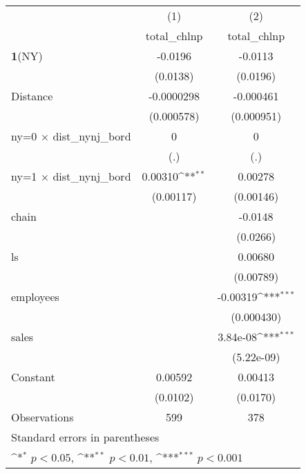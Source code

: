{
\def\sym#1{\ifmmode^{#1}\else\(^{#1}\)\fi}
\begin{tabular}{l*{2}{c}}
\hline\hline
                    &\multicolumn{1}{c}{(1)}&\multicolumn{1}{c}{(2)}\\
                    &\multicolumn{1}{c}{total\_chlnp}&\multicolumn{1}{c}{total\_chlnp}\\
\hline
\textbf{1}(NY)      &     -0.0196         &     -0.0113         \\
                    &    (0.0138)         &    (0.0196)         \\
[1em]
Distance            &  -0.0000298         &   -0.000461         \\
                    &  (0.000578)         &  (0.000951)         \\
[1em]
ny=0 $\times$ dist\_nynj\_bord&           0         &           0         \\
                    &         (.)         &         (.)         \\
[1em]
ny=1 $\times$ dist\_nynj\_bord&     0.00310\sym{**} &     0.00278         \\
                    &   (0.00117)         &   (0.00146)         \\
[1em]
chain               &                     &     -0.0148         \\
                    &                     &    (0.0266)         \\
[1em]
ls                  &                     &     0.00680         \\
                    &                     &   (0.00789)         \\
[1em]
employees           &                     &    -0.00319\sym{***}\\
                    &                     &  (0.000430)         \\
[1em]
sales               &                     &    3.84e-08\sym{***}\\
                    &                     &  (5.22e-09)         \\
[1em]
Constant            &     0.00592         &     0.00413         \\
                    &    (0.0102)         &    (0.0170)         \\
\hline
Observations        &         599         &         378         \\
\hline\hline
\multicolumn{3}{l}{\footnotesize Standard errors in parentheses}\\
\multicolumn{3}{l}{\footnotesize \sym{*} \(p<0.05\), \sym{**} \(p<0.01\), \sym{***} \(p<0.001\)}\\
\end{tabular}
}
